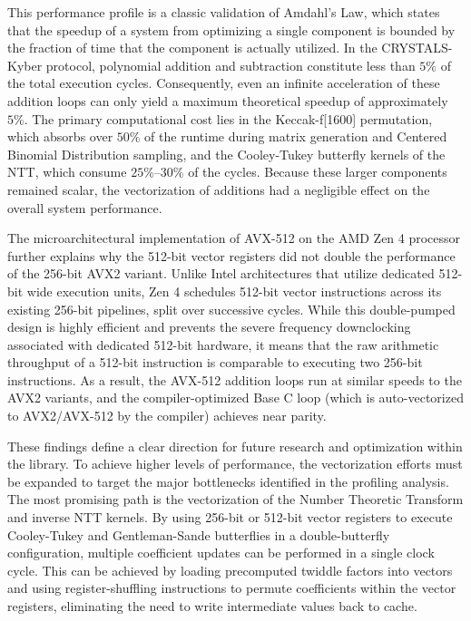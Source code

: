 This performance profile is a classic validation of Amdahl's Law, which states that the speedup of a system from optimizing a single component is bounded by the fraction of time that the component is actually utilized. In the CRYSTALS-Kyber protocol, polynomial addition and subtraction constitute less than $5\%$ of the total execution cycles. Consequently, even an infinite acceleration of these addition loops can only yield a maximum theoretical speedup of approximately $5\%$. The primary computational cost lies in the Keccak-f[1600] permutation, which absorbs over $50\%$ of the runtime during matrix generation and Centered Binomial Distribution sampling, and the Cooley-Tukey butterfly kernels of the NTT, which consume $25\%\text{--}30\%$ of the cycles. Because these larger components remained scalar, the vectorization of additions had a negligible effect on the overall system performance.

The microarchitectural implementation of AVX-512 on the AMD Zen 4 processor further explains why the 512-bit vector registers did not double the performance of the 256-bit AVX2 variant. Unlike Intel architectures that utilize dedicated 512-bit wide execution units, Zen 4 schedules 512-bit vector instructions across its existing 256-bit pipelines, split over successive cycles. While this double-pumped design is highly efficient and prevents the severe frequency downclocking associated with dedicated 512-bit hardware, it means that the raw arithmetic throughput of a 512-bit instruction is comparable to executing two 256-bit instructions. As a result, the AVX-512 addition loops run at similar speeds to the AVX2 variants, and the compiler-optimized Base C loop (which is auto-vectorized to AVX2/AVX-512 by the compiler) achieves near parity.

These findings define a clear direction for future research and optimization within the library. To achieve higher levels of performance, the vectorization efforts must be expanded to target the major bottlenecks identified in the profiling analysis. The most promising path is the vectorization of the Number Theoretic Transform and inverse NTT kernels. By using 256-bit or 512-bit vector registers to execute Cooley-Tukey and Gentleman-Sande butterflies in a double-butterfly configuration, multiple coefficient updates can be performed in a single clock cycle. This can be achieved by loading precomputed twiddle factors into vectors and using register-shuffling instructions to permute coefficients within the vector registers, eliminating the need to write intermediate values back to cache.

